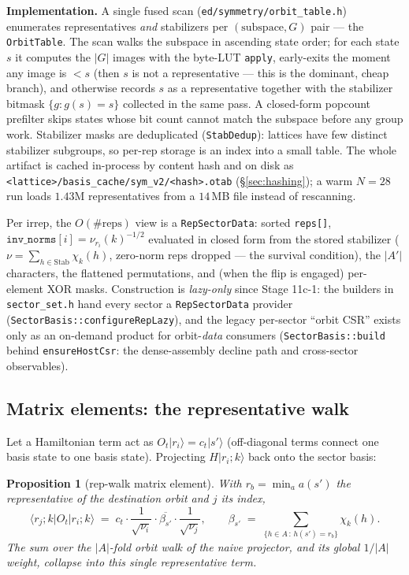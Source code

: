 \documentclass[11pt]{article}
\newtheorem{prop}{Proposition}[section]
\newcommand{\Stab}{\mathrm{Stab}}
\newcommand{\ket}[1]{|#1\rangle}
\newcommand{\bra}[1]{\langle#1|}
\newcommand{\file}[1]{\texttt{\small #1}}
\begin{document}
\textbf{Implementation.} A single fused scan
(\file{ed/symmetry/orbit\_table.h}) enumerates representatives \emph{and}
stabilizers per $(\text{subspace}, G)$ pair --- the \texttt{OrbitTable}.
The scan walks the subspace in ascending state order; for each state $s$ it
computes the $|G|$ images with the byte-LUT \texttt{apply}, early-exits the
moment any image is $< s$ (then $s$ is not a representative --- this is the
dominant, cheap branch), and otherwise records $s$ as a representative
together with the stabilizer bitmask $\{g : g(s) = s\}$ collected in the
same pass. A closed-form popcount prefilter skips states whose bit count
cannot match the subspace before any group work. Stabilizer masks are
deduplicated (\texttt{StabDedup}): lattices have few distinct stabilizer
subgroups, so per-rep storage is an index into a small table. The whole
artifact is cached in-process by content hash and on disk as
\texttt{<lattice>/basis\_cache/sym\_v2/<hash>.otab}
(\S\ref{sec:hashing}); a warm $N{=}28$ run loads $1.43$M representatives
from a $14$\,MB file instead of rescanning.

Per irrep, the $O(\#\text{reps})$ view is a \texttt{RepSectorData}: sorted
\texttt{reps[]}, $\texttt{inv\_norms}[i] = \nu_{r_i}(k)^{-1/2}$ evaluated
in closed form from the stored stabilizer
($\nu = \sum_{h \in \Stab} \chi_k(h)$, zero-norm reps dropped --- the
survival condition), the $|A'|$ characters, the flattened permutations, and
(when the flip is engaged) per-element XOR masks. Construction is
\emph{lazy-only} since Stage 11c-1: the builders in \file{sector\_set.h}
hand every sector a \texttt{RepSectorData} provider
(\texttt{SectorBasis::configureRepLazy}), and the legacy per-sector ``orbit
CSR'' exists only as an on-demand product for orbit-\emph{data} consumers
(\texttt{SectorBasis::build} behind \texttt{ensureHostCsr}: the
dense-assembly decline path and cross-sector observables).

\subsection{Matrix elements: the representative walk}
\label{sec:repwalk}

Let a Hamiltonian term act as $O_t \ket{r_i} = c_t \ket{s'}$ (off-diagonal
terms connect one basis state to one basis state). Projecting
$H \ket{r_i;k}$ back onto the sector basis:

\begin{prop}[rep-walk matrix element]\label{prop:repwalk}
With $r_b = \min_{a} a(s')$ the representative of the destination orbit and
$j$ its index,
\begin{equation}
  \bra{r_j;k} O_t \ket{r_i;k}
  \;=\;
  c_t \cdot \frac{1}{\sqrt{\nu_i}} \cdot
  \overline{\beta_{s'}} \cdot \frac{1}{\sqrt{\nu_j}},
  \qquad
  \beta_{s'} \;=\; \sum_{\{h \in A \,:\, h(s') = r_b\}} \chi_k(h).
  \label{eq:repel}
\end{equation}
The sum over the $|A|$-fold orbit walk of the naive projector, and its
global $1/|A|$ weight, collapse into this single representative term.
\end{prop}
\end{document}
